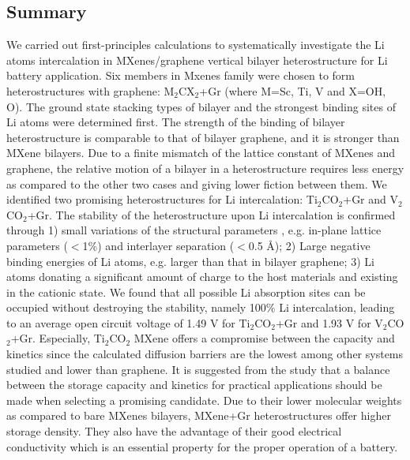 \subsection{Summary}
We carried out first-principles calculations to systematically investigate the Li atoms intercalation in MXenes/graphene vertical bilayer heterostructure for Li battery application. Six members in Mxenes family were chosen to form heterostructures with graphene: M$_2$CX$_2$+Gr (where M=Sc, Ti, V and X=OH, O). The ground state stacking types of bilayer and the strongest binding sites of Li atoms were determined first. The strength of the binding of bilayer heterostructure is comparable to that of bilayer graphene, and it is stronger than MXene bilayers. Due to a finite mismatch of the lattice constant of MXenes and graphene, the relative motion of a bilayer in a heterostructure requires less energy as compared to the other two cases and giving lower fiction between them. We identified two promising heterostructures for Li intercalation: Ti$_2$CO$_2$+Gr and V$_2$CO$_2$+Gr. The stability of the heterostructure upon Li intercalation is confirmed through 1) small variations of the structural parameters , e.g. in-plane lattice parameters ($<$1\%) and interlayer separation ($<$0.5 {\AA}); 2) Large negative binding energies of Li atoms, e.g. larger than that in bilayer graphene; 3) Li atoms donating a significant amount of charge to the host materials and existing in the cationic state. We found that all possible Li absorption sites can be occupied without destroying the stability, namely 100\% Li intercalation, leading to an average open circuit voltage of 1.49 V for Ti$_2$CO$_2$+Gr and 1.93 V for V$_2$CO$_2$+Gr. Especially, Ti$_2$CO$_2$ MXene offers a compromise between the capacity and kinetics since the calculated diffusion barriers are the lowest among other systems studied and lower than graphene.  It is suggested from the study that a balance between the storage capacity and kinetics for practical applications should be made when selecting a promising candidate. Due to their lower molecular weights as compared to bare MXenes bilayers,  MXene+Gr heterostructures offer higher storage density. They also have the advantage of their good electrical conductivity which is an essential property for the proper operation of a battery. 